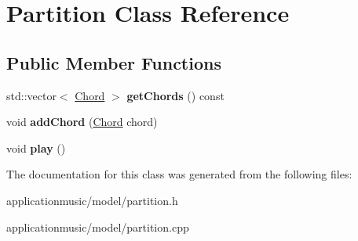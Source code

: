 \hypertarget{class_partition}{\section{Partition Class Reference}
\label{class_partition}
}
\subsection*{Public Member Functions}
\begin{DoxyCompactItemize}
\item 
\hypertarget{class_partition_af1545c5b8592550cd0bed90a928acefd}{std\-::vector$<$ \hyperlink{class_chord}{Chord} $>$ {\bfseries get\-Chords} () const }\label{class_partition_af1545c5b8592550cd0bed90a928acefd}

\item 
\hypertarget{class_partition_aa189e533c960f3e64f1bec99a095ded2}{void {\bfseries add\-Chord} (\hyperlink{class_chord}{Chord} chord)}\label{class_partition_aa189e533c960f3e64f1bec99a095ded2}

\item 
\hypertarget{class_partition_a0cda9a7ca06a596adf4879a56e8fb9bb}{void {\bfseries play} ()}\label{class_partition_a0cda9a7ca06a596adf4879a56e8fb9bb}

\end{DoxyCompactItemize}


The documentation for this class was generated from the following files\-:\begin{DoxyCompactItemize}
\item 
applicationmusic/model/partition.\-h\item 
applicationmusic/model/partition.\-cpp\end{DoxyCompactItemize}
